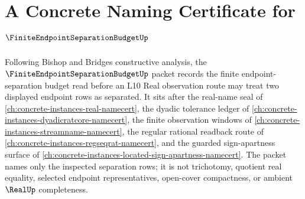 \chapter{A Concrete Naming Certificate for $\FiniteEndpointSeparationBudgetUp$}
\label{ch:concrete-instances-finite-endpoint-separation-budget-namecert}

Following Bishop and Bridges constructive analysis, the $\FiniteEndpointSeparationBudgetUp$ packet records the finite endpoint-separation budget read before an L10 Real observation route may treat two displayed endpoint rows as separated. It sits after the real-name seal of \autoref{ch:concrete-instances-real-namecert}, the dyadic tolerance ledger of \autoref{ch:concrete-instances-dyadicratcore-namecert}, the finite observation windows of \autoref{ch:concrete-instances-streamname-namecert}, the regular rational readback route of \autoref{ch:concrete-instances-regseqrat-namecert}, and the guarded sign-apartness surface of \autoref{ch:concrete-instances-located-sign-apartness-namecert}. The packet names only the inspected separation rows; it is not trichotomy, quotient real equality, selected endpoint representatives, open-cover compactness, or ambient $\RealUp$ completeness.

